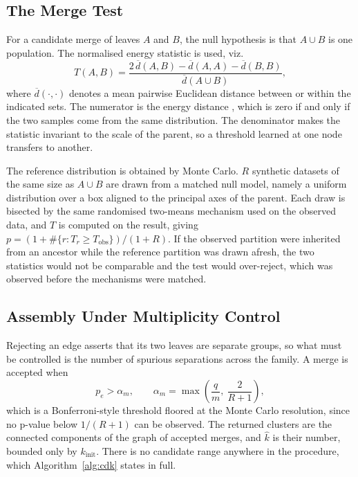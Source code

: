 \documentclass[runningheads]{llncs}
\begin{document}
\subsection{The Merge Test}

For a candidate merge of leaves $A$ and $B$, the null hypothesis is that
$A \cup B$ is one population. The normalised energy statistic is used, viz.
\begin{equation}
T(A,B) = \frac{2\,\overline{d}(A,B) - \overline{d}(A,A) - \overline{d}(B,B)}
              {\overline{d}(A \cup B)},
\end{equation}
where $\overline{d}(\cdot,\cdot)$ denotes a mean pairwise Euclidean distance
between or within the indicated sets. The numerator is the energy distance
\cite{szekely2013energy}, which is zero if and only if the two samples come
from the same distribution. The denominator makes the statistic invariant to
the scale of the parent, so a threshold learned at one node transfers to
another.

The reference distribution is obtained by Monte Carlo. $R$ synthetic datasets
of the same size as $A \cup B$ are drawn from a matched null model, namely a
uniform distribution over a box aligned to the principal axes of the parent.
Each draw is bisected by the same randomised two-means mechanism used on the
observed data, and $T$ is computed on the result, giving
$p = (1 + \#\{r : T_r \ge T_{\text{obs}}\})/(1 + R)$. If the observed
partition were inherited from an ancestor while the reference partition was
drawn afresh, the two statistics would not be comparable and the test would
over-reject, which was observed before the mechanisms were matched.

\subsection{Assembly Under Multiplicity Control}

Rejecting an edge asserts that its two leaves are separate groups, so what
must be controlled is the number of spurious separations across the family. A
merge is accepted when
\begin{equation}
p_e > \alpha_m, \qquad
\alpha_m = \max\!\left(\frac{q}{m},\ \frac{2}{R+1}\right),
\end{equation}
which is a Bonferroni-style threshold floored at the Monte Carlo resolution,
since no p-value below $1/(R+1)$ can be observed. The returned clusters are
the connected components of the graph of accepted merges, and $\hat k$ is
their number, bounded only by $k_{\text{init}}$. There is no candidate range
anywhere in the procedure, which Algorithm~\ref{alg:cdk} states in full.
\end{document}
